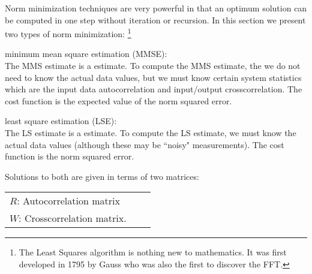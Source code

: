 Norm minimization techniques are very powerful
in that an optimum solution can be computed
in one step without iteration or recursion.
In this section we present two types of norm minimization:
\footnote{
   The Least Squares algorithm is nothing new to mathematics.
   It was first developed in 1795 by Gauss who was also the first
   to discover the FFT.
   }

\begin{enume}
  \item minimum mean square estimation (MMSE): \\
        The MMS estimate is a  estimate.
        To compute the MMS estimate, the we do not need to know
        the actual data values, but we must know certain system statistics
        which are the
        input data autocorrelation and input/output crosscorrelation.
        The cost function is the expected value of the norm squared error.
   \item least square estimation (LSE): \\
        The LS estimate is a  estimate.
        To compute the LS estimate, we must know the actual data values
        (although these may be ``noisy" measurements).
        The cost function is the norm squared error.
\end{enume}

Solutions to both are given in terms of two matrices:

\begin{tabular}{lll}
   $R$: Autocorrelation matrix \\
   $W$: Crosscorrelation matrix.
\end{tabular}

